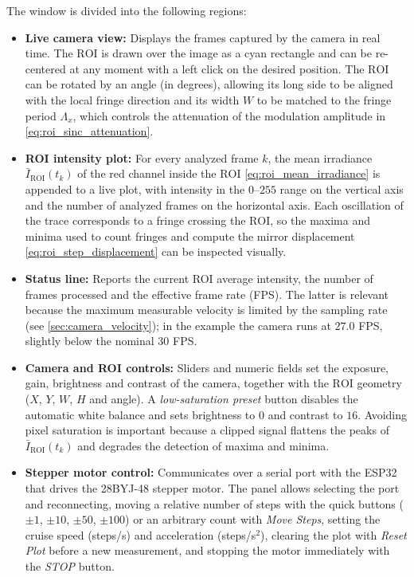 The window is divided into the following regions:
\begin{itemize}
    \item \textbf{Live camera view:} Displays the frames captured by the camera in real time. The $\text{ROI}$ is drawn over the image as a cyan rectangle and can be re-centered at any moment with a left click on the desired position. The $\text{ROI}$ can be rotated by an angle (in degrees), allowing its long side to be aligned with the local fringe direction and its width $W$ to be matched to the fringe period $\Lambda_x$, which controls the attenuation of the modulation amplitude in \cref{eq:roi_sinc_attenuation}.

    \item \textbf{ROI intensity plot:} For every analyzed frame $k$, the mean irradiance $\bar{I}_{\text{ROI}}(t_k)$ of the red channel inside the $\text{ROI}$ \cref{eq:roi_mean_irradiance} is appended to a live plot, with intensity in the $0$--$255$ range on the vertical axis and the number of analyzed frames on the horizontal axis. Each oscillation of the trace corresponds to a fringe crossing the $\text{ROI}$, so the maxima and minima used to count fringes and compute the mirror displacement \cref{eq:roi_step_displacement} can be inspected visually.

    \item \textbf{Status line:} Reports the current ROI average intensity, the number of frames processed and the effective frame rate (FPS). The latter is relevant because the maximum measurable velocity is limited by the sampling rate (see \cref{sec:camera_velocity}); in the example the camera runs at $27.0$ FPS, slightly below the nominal $30$ FPS.

    \item \textbf{Camera and ROI controls:} Sliders and numeric fields set the exposure, gain, brightness and contrast of the camera, together with the $\text{ROI}$ geometry ($X$, $Y$, $W$, $H$ and angle). A \emph{low-saturation preset} button disables the automatic white balance and sets brightness to $0$ and contrast to $16$. Avoiding pixel saturation is important because a clipped signal flattens the peaks of $\bar{I}_{\text{ROI}}(t_k)$ and degrades the detection of maxima and minima.

    \item \textbf{Stepper motor control:} Communicates over a serial port with the ESP32 that drives the 28BYJ-48 stepper motor. The panel allows selecting the port and reconnecting, moving a relative number of steps with the quick buttons ($\pm 1$, $\pm 10$, $\pm 50$, $\pm 100$) or an arbitrary count with \emph{Move Steps}, setting the cruise speed (steps/s) and acceleration (steps/s$^2$), clearing the plot with \emph{Reset Plot} before a new measurement, and stopping the motor immediately with the \emph{STOP} button.
\end{itemize}

